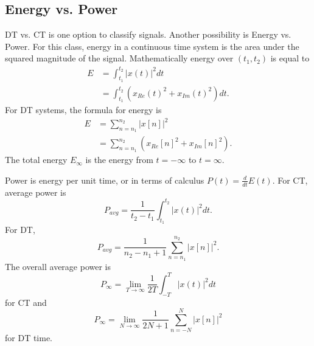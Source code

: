 \subsection{Energy vs. Power}
DT vs. CT is one option to classify signals. Another
possibility is Energy vs. Power. For this class, energy in a continuous
time system is the area under the squared magnitude of the signal. Mathematically
energy over $(t_1, t_2)$ is equal to
\begin{align}
    E & = \int_{t_1}^{t_2} |x(t)|^2 dt                     \\
      & = \int_{t_1}^{t_2} (x_{Re}(t)^2 + x_{Im}(t)^2) dt.
\end{align}
For DT systems, the formula for energy is
\begin{align}
    E & = \sum_{n=n_1}^{n_2} |x[n]|^2                     \\
      & = \sum_{n=n_1}^{n_2} (x_{Re}[n]^2 + x_{Im}[n]^2).
\end{align}
The total energy $E_\infty$ is the energy from $t = -\infty$ to $t = \infty$.

Power is energy per unit time, or in terms of calculus $P(t) = \frac{d}{dt}E(t)$.
For CT, average power is
\begin{equation}
    P_{avg} = \frac{1}{t_2 - t_1} \int_{t_1}^{t_2} |x(t)|^2 dt.
\end{equation}
For DT,
\begin{equation}
    P_{avg} = \frac{1}{n_2 - n_1 + 1} \sum_{n=n_1}^{n_2} |x[n]|^2.
\end{equation}
The overall average power is
\begin{equation}
    P_{\infty} = \lim_{T \rightarrow \infty} \frac{1}{2T} \int_{-T}^{T} |x(t)|^2 dt
\end{equation}
for CT and
\begin{equation}
    P_{\infty} = \lim_{N \rightarrow \infty} \frac{1}{2N + 1} \sum_{n=-N}^{N} |x[n]|^2
\end{equation}
for DT time.